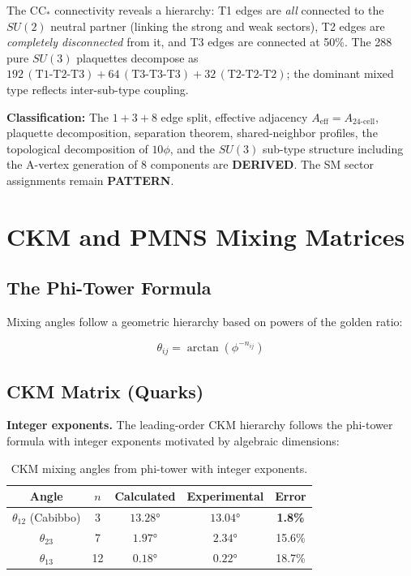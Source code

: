 \documentclass[12pt,a4paper]{article}
\begin{document}
The CC$_*$ connectivity reveals a hierarchy: T1 edges are \emph{all} connected to the $SU(2)$ neutral partner (linking the strong and weak sectors), T2 edges are \emph{completely disconnected} from it, and T3 edges are connected at 50\%. The 288 pure $SU(3)$ plaquettes decompose as $192\,(\text{T1-T2-T3}) + 64\,(\text{T3-T3-T3}) + 32\,(\text{T2-T2-T2})$; the dominant mixed type reflects inter-sub-type coupling.

\textbf{Classification:} The $1 + 3 + 8$ edge split, effective adjacency $A_{\text{eff}} = A_{\text{24-cell}}$, plaquette decomposition, separation theorem, shared-neighbor profiles, the topological decomposition of $10\phi$, and the $SU(3)$ sub-type structure including the A-vertex generation of 8 components are \textbf{DERIVED}. The SM sector assignments remain \textbf{PATTERN}.

\section{CKM and PMNS Mixing Matrices}

\subsection{The Phi-Tower Formula}

Mixing angles follow a geometric hierarchy based on powers of the golden ratio:

\begin{equation}
\boxed{\theta_{ij} = \arctan(\phi^{-n_{ij}})}
\end{equation}

\subsection{CKM Matrix (Quarks)}

\textbf{Integer exponents.} The leading-order CKM hierarchy follows the phi-tower formula with integer exponents motivated by algebraic dimensions:

\begin{table}[H]
\centering
\begin{tabular}{ccccc}
\toprule
\textbf{Angle} & \textbf{$n$} & \textbf{Calculated} & \textbf{Experimental} & \textbf{Error} \\
\midrule
$\theta_{12}$ (Cabibbo) & 3 & $13.28°$ & $13.04°$ & \textbf{1.8\%} \\
$\theta_{23}$ & 7 & $1.97°$ & $2.34°$ & 15.6\% \\
$\theta_{13}$ & 12 & $0.18°$ & $0.22°$ & 18.7\% \\
\bottomrule
\end{tabular}
\caption{CKM mixing angles from phi-tower with integer exponents.}
\end{table}
\end{document}
